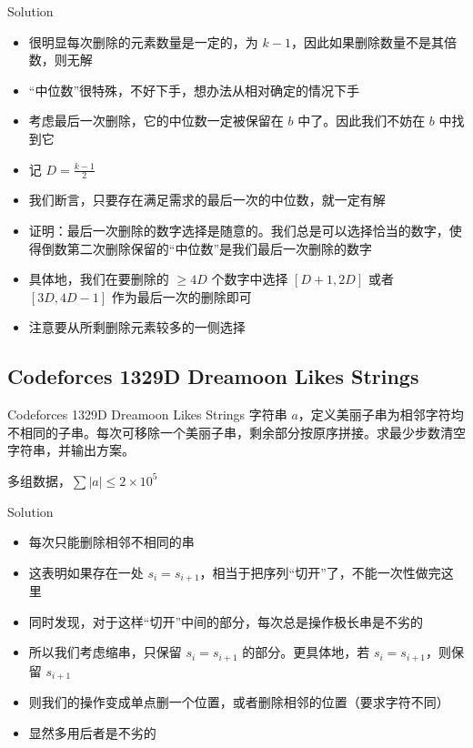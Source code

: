 ﻿\documentclass[aspectratio=169]{ctexbeamer}
\begin{document}
\begin{frame}{Solution}
    \begin{itemize}
        \item 很明显每次删除的元素数量是一定的，为 $k-1$，因此如果删除数量不是其倍数，则无解
        \item “中位数”很特殊，不好下手，想办法从相对确定的情况下手
        \item 考虑最后一次删除，它的中位数一定被保留在 $b$ 中了。因此我们不妨在 $b$ 中找到它
        \item 记 $D=\frac{k-1}{2}$
        \item 我们断言，只要存在满足需求的最后一次的中位数，就一定有解
        \item 证明：最后一次删除的数字选择是随意的。我们总是可以选择恰当的数字，使得倒数第二次删除保留的“中位数”是我们最后一次删除的数字
        \item 具体地，我们在要删除的 $\ge4D$ 个数字中选择 $[D+1,2D]$ 或者 $[3D,4D-1]$ 作为最后一次的删除即可
        \item 注意要从所剩删除元素较多的一侧选择
    \end{itemize}
\end{frame}

\subsection{Codeforces 1329D Dreamoon Likes Strings}
\begin{frame}{Codeforces 1329D Dreamoon Likes Strings}
    字符串 $a$，定义美丽子串为相邻字符均不相同的子串。每次可移除一个美丽子串，剩余部分按原序拼接。求最少步数清空字符串，并输出方案。
    
    多组数据，$\sum|a|\le 2\times10^5$
\end{frame}

\begin{frame}{Solution}
    \begin{itemize}
        \item 每次只能删除相邻不相同的串
        \item 这表明如果存在一处 $s_i=s_{i+1}$，相当于把序列“切开”了，不能一次性做完这里
        \item 同时发现，对于这样“切开”中间的部分，每次总是操作极长串是不劣的
        \item 所以我们考虑缩串，只保留 $s_i=s_{i+1}$ 的部分。更具体地，若 $s_i=s_{i+1}$，则保留 $s_{i+1}$
        \item 则我们的操作变成单点删一个位置，或者删除相邻的位置（要求字符不同）
        \item 显然多用后者是不劣的
    \end{itemize}
\end{frame}
\end{document}
